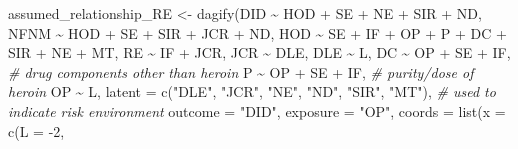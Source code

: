 \documentclass[
]{article}
\newenvironment{Shaded}{\begin{snugshade}}{\end{snugshade}}
\newcommand{\AttributeTok}[1]{\textcolor[rgb]{0.77,0.63,0.00}{#1}}
\newcommand{\CommentTok}[1]{\textcolor[rgb]{0.56,0.35,0.01}{\textit{#1}}}
\newcommand{\DecValTok}[1]{\textcolor[rgb]{0.00,0.00,0.81}{#1}}
\newcommand{\FunctionTok}[1]{\textcolor[rgb]{0.00,0.00,0.00}{#1}}
\newcommand{\NormalTok}[1]{#1}
\newcommand{\OtherTok}[1]{\textcolor[rgb]{0.56,0.35,0.01}{#1}}
\newcommand{\SpecialCharTok}[1]{\textcolor[rgb]{0.00,0.00,0.00}{#1}}
\newcommand{\StringTok}[1]{\textcolor[rgb]{0.31,0.60,0.02}{#1}}
\begin{document}
\begin{Shaded}
\begin{Highlighting}[]
\NormalTok{assumed\_relationship\_RE }\OtherTok{\textless{}{-}} \FunctionTok{dagify}\NormalTok{(DID }\SpecialCharTok{\textasciitilde{}}\NormalTok{ HOD }\SpecialCharTok{+}\NormalTok{ SE }\SpecialCharTok{+}\NormalTok{ NE }\SpecialCharTok{+}\NormalTok{ SIR }\SpecialCharTok{+}\NormalTok{ ND,}
\NormalTok{                                          NFNM }\SpecialCharTok{\textasciitilde{}}\NormalTok{ HOD }\SpecialCharTok{+}\NormalTok{ SE }\SpecialCharTok{+}\NormalTok{ SIR }\SpecialCharTok{+}\NormalTok{ JCR }\SpecialCharTok{+}\NormalTok{ ND,}
\NormalTok{                                          HOD }\SpecialCharTok{\textasciitilde{}}\NormalTok{ SE }\SpecialCharTok{+}\NormalTok{ IF }\SpecialCharTok{+}\NormalTok{ OP }\SpecialCharTok{+}\NormalTok{ P }\SpecialCharTok{+}\NormalTok{ DC }\SpecialCharTok{+}\NormalTok{ SIR }\SpecialCharTok{+}\NormalTok{ NE }\SpecialCharTok{+}\NormalTok{ MT,}
\NormalTok{                                          RE }\SpecialCharTok{\textasciitilde{}}\NormalTok{ IF }\SpecialCharTok{+}\NormalTok{ JCR,}
\NormalTok{                                          JCR }\SpecialCharTok{\textasciitilde{}}\NormalTok{ DLE,}
\NormalTok{                                          DLE }\SpecialCharTok{\textasciitilde{}}\NormalTok{ L,}
\NormalTok{                                          DC }\SpecialCharTok{\textasciitilde{}}\NormalTok{ OP }\SpecialCharTok{+}\NormalTok{ SE }\SpecialCharTok{+}\NormalTok{ IF, }\CommentTok{\# drug components other than heroin}
\NormalTok{                                          P }\SpecialCharTok{\textasciitilde{}}\NormalTok{ OP }\SpecialCharTok{+}\NormalTok{ SE }\SpecialCharTok{+}\NormalTok{ IF, }\CommentTok{\# purity/dose of heroin}
\NormalTok{                                          OP }\SpecialCharTok{\textasciitilde{}}\NormalTok{ L,}
                                          \AttributeTok{latent =} \FunctionTok{c}\NormalTok{(}\StringTok{"DLE"}\NormalTok{, }\StringTok{"JCR"}\NormalTok{, }\StringTok{"NE"}\NormalTok{, }\StringTok{"ND"}\NormalTok{, }\StringTok{"SIR"}\NormalTok{, }\StringTok{"MT"}\NormalTok{), }\CommentTok{\# used to indicate risk environment}
                                          \AttributeTok{outcome =} \StringTok{"DID"}\NormalTok{,}
                                          \AttributeTok{exposure =} \StringTok{"OP"}\NormalTok{,}
                                          \AttributeTok{coords =} \FunctionTok{list}\NormalTok{(}\AttributeTok{x =} \FunctionTok{c}\NormalTok{(}\AttributeTok{L =} \SpecialCharTok{{-}}\DecValTok{2}\NormalTok{,}

\end{Highlighting}
\end{Shaded}
\end{document}

